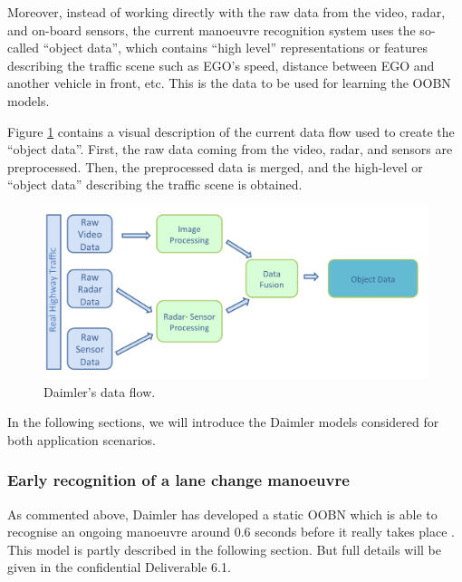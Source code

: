 Moreover, instead of working directly with the raw data from the video, radar, and on-board sensors, the current manoeuvre recognition system uses the so-called ``object data'', which contains ``high level'' representations or features describing the traffic scene such as EGO's speed, distance between EGO and another vehicle in front, etc. This is the data to be used for learning the OOBN models.

Figure \ref{Figure:DaimlerDataFlow} contains a visual description of the current data flow used to create the ``object data''.  First, the raw data coming from the video, radar, and sensors are preprocessed. Then, the preprocessed data is merged, and the high-level or ``object data'' describing the traffic scene is obtained. 

\begin{figure}[ht!]
\begin{center}
\includegraphics[scale=0.35]{./figures/DaimlerDataFlow}
\caption{\label{Figure:DaimlerDataFlow} Daimler's data flow.}
\end{center}
\end{figure}

In the following sections, we will introduce the Daimler models considered for both application scenarios.

\subsubsection{Early recognition of a lane change manoeuvre}\label{Section:Daimler:EarlyRecognition}

As commented above, Daimler has developed a static OOBN which is able to recognise an ongoing manoeuvre around 0.6 seconds before it really takes place \cite{kasper2012object}.  This model is partly described in the following section. But full details will be given in the confidential Deliverable 6.1.   


